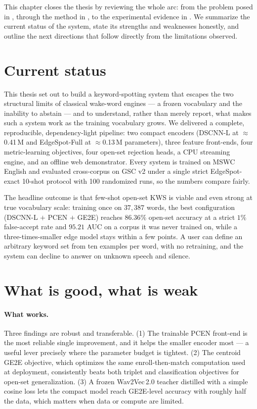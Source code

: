 \documentclass[12pt,a4paper]{report}
\begin{document}
This chapter closes the thesis by reviewing the whole arc: from the problem posed
in , through the method in , to the experimental
evidence in . We summarize the current status of the system,
state its strengths and weaknesses honestly, and outline the next directions that
follow directly from the limitations observed.

\section{Current status}\label{sec:status}

This thesis set out to build a keyword-spotting system that escapes the two
structural limits of classical wake-word engines --- a frozen vocabulary and the
inability to abstain --- and to understand, rather than merely report, what makes
such a system work as the training vocabulary grows. We delivered a complete,
reproducible, dependency-light pipeline: two compact encoders (DSCNN-L at
$\approx$0.41\,M and EdgeSpot-Full at $\approx$0.13\,M parameters), three feature
front-ends, four metric-learning objectives, four open-set rejection heads, a
CPU streaming engine, and an offline web demonstrator. Every system is trained on
MSWC English and evaluated cross-corpus on GSC v2 under a single strict
EdgeSpot-exact 10-shot protocol with 100 randomized runs, so the numbers compare
fairly.

The headline outcome is that few-shot open-set KWS is viable and even strong at
true vocabulary scale: training once on $37{,}387$ words, the best configuration
(DSCNN-L $+$ PCEN $+$ GE2E) reaches $86.36\%$ open-set accuracy at a strict
$1\%$ false-accept rate and $95.21$ AUC on a corpus it was never trained on, while
a three-times-smaller edge model stays within a few points. A user can define an
arbitrary keyword set from ten examples per word, with no retraining, and the
system can decline to answer on unknown speech and silence.

\section{What is good, what is weak}\label{sec:goodbad}

\paragraph{What works.} Three findings are robust and transferable. (1) The
trainable PCEN front-end is the most reliable single improvement, and it helps the
smaller encoder most --- a useful lever precisely where the parameter budget is
tightest. (2) The centroid GE2E objective, which optimizes the same
enroll-then-match computation used at deployment, consistently beats both triplet
and classification objectives for open-set generalization. (3) A frozen
Wav2Vec\,2.0 teacher distilled with a simple cosine loss lets the compact model
reach GE2E-level accuracy with roughly half the data, which matters when data or
compute are limited.
\end{document}
